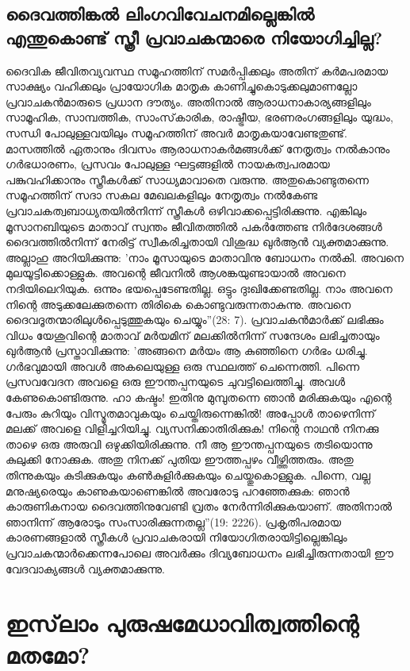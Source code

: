  \section{ ദൈവത്തിങ്കല്‍ ലിംഗവിവേചനമില്ലെങ്കില്‍ എന്തുകൊണ്ട് സ്ത്രീ പ്രവാചകന്മാരെ നിയോഗിച്ചില്ല?}

ദൈവിക ജീവിതവ്യവസ്ഥ സമൂഹത്തിന് സമര്‍പ്പിക്കലും അതിന് കര്‍മപരമായ സാക്ഷ്യം വഹിക്കലും പ്രായോഗിക മാതൃക കാണിച്ചുകൊടുക്കലുമാണല്ലോ പ്രവാചകന്‍മാരുടെ പ്രധാന ദൗത്യം. അതിനാല്‍ ആരാധനാകാര്യങ്ങളിലും സാമൂഹിക, സാമ്പത്തിക, സാംസ്‌കാരിക, രാഷ്ട്രീയ, ഭരണരംഗങ്ങളിലും യുദ്ധം, സന്ധി പോലുള്ളവയിലും സമൂഹത്തിന് അവര്‍ മാതൃകയാവേണ്ടതുണ്ട്. മാസത്തില്‍ ഏതാനും ദിവസം ആരാധനാകര്‍മങ്ങള്‍ക്ക് നേതൃത്വം നല്‍കാനും ഗര്‍ഭധാരണം, പ്രസവം പോലുള്ള ഘട്ടങ്ങളില്‍ നായകത്വപരമായ പങ്കുവഹിക്കാനും സ്ത്രീകള്‍ക്ക് സാധ്യമാവാതെ വരുന്നു. അതുകൊണ്ടുതന്നെ സമൂഹത്തിന് സദാ സകല മേഖലകളിലും നേതൃത്വം നല്‍കേണ്ട പ്രവാചകത്വബാധ്യതയില്‍നിന്ന് സ്ത്രീകള്‍ ഒഴിവാക്കപ്പെട്ടിരിക്കുന്നു. എങ്കിലും മൂസാനബിയുടെ മാതാവ് സ്വന്തം ജീവിതത്തില്‍ പകര്‍ത്തേണ്ട നിര്‍ദേശങ്ങള്‍ ദൈവത്തില്‍നിന്ന് നേരിട്ട് സ്വീകരിച്ചതായി വിശുദ്ധ ഖുര്‍ആന്‍ വ്യക്തമാക്കുന്നു. അല്ലാഹു അറിയിക്കുന്നു: 'നാം മൂസായുടെ മാതാവിനു ബോധനം നല്‍കി. അവനെ മുലയൂട്ടിക്കൊള്ളുക. അവന്റെ ജീവനില്‍ ആശങ്കയുണ്ടായാല്‍ അവനെ നദിയിലെറിയുക. ഒന്നും ഭയപ്പെടേണ്ടതില്ല. ഒട്ടും ദുഃഖിക്കേണ്ടതില്ല. നാം അവനെ നിന്റെ അടുക്കലേക്കുതന്നെ തിരികെ കൊണ്ടുവരുന്നതാകുന്നു. അവനെ ദൈവദൂതന്മാരിലുള്‍പ്പെടുത്തുകയും ചെയ്യും''(28: 7).
പ്രവാചകന്‍മാര്‍ക്ക് ലഭിക്കും വിധം യേശുവിന്റെ മാതാവ് മര്‍യമിന് മലക്കില്‍നിന്ന് സന്ദേശം ലഭിച്ചതായും ഖുര്‍ആന്‍ പ്രസ്താവിക്കുന്നു: 'അങ്ങനെ മര്‍യം ആ കുഞ്ഞിനെ ഗര്‍ഭം ധരിച്ചു. ഗര്‍ഭവുമായി അവള്‍ അകലെയുള്ള ഒരു സ്ഥലത്ത് ചെന്നെത്തി. പിന്നെ പ്രസവവേദന അവളെ ഒരു ഈന്തപ്പനയുടെ ചുവട്ടിലെത്തിച്ചു. അവള്‍ കേണുകൊണ്ടിരുന്നു. ഹാ കഷ്ടം! ഇതിനു മുമ്പുതന്നെ ഞാന്‍ മരിക്കുകയും എന്റെ പേരും കുറിയും വിസ്മൃതമാവുകയും ചെയ്തിരുന്നെങ്കില്‍! അപ്പോള്‍ താഴെനിന്ന് മലക്ക് അവളെ വിളിച്ചറിയിച്ചു. വ്യസനിക്കാതിരിക്കുക! നിന്റെ നാഥന്‍ നിനക്കു താഴെ ഒരു അരുവി ഒഴുക്കിയിരിക്കുന്നു. നീ ആ ഈന്തപ്പനയുടെ തടിയൊന്നു കുലുക്കി നോക്കുക. അതു നിനക്ക് പുതിയ ഈത്തപ്പഴം വീഴ്ത്തിത്തരും. അതു തിന്നുകയും കുടിക്കുകയും കണ്‍കുളിര്‍ക്കുകയും ചെയ്തുകൊള്ളുക. പിന്നെ, വല്ല മനുഷ്യരെയും കാണുകയാണെങ്കില്‍ അവരോടു പറഞ്ഞേക്കുക: ഞാന്‍ കാരുണികനായ ദൈവത്തിനുവേണ്ടി വ്രതം നേര്‍ന്നിരിക്കുകയാണ്. അതിനാല്‍ ഞാനിന്ന് ആരോടും സംസാരിക്കുന്നതല്ല''(19: 2226).
പ്രകൃതിപരമായ കാരണങ്ങളാല്‍ സ്ത്രീകള്‍ പ്രവാചകരായി നിയോഗിതരായിട്ടില്ലെങ്കിലും പ്രവാചകന്മാര്‍ക്കെന്നപോലെ അവര്‍ക്കും ദിവ്യബോധനം ലഭിച്ചിരുന്നതായി ഈ വേദവാക്യങ്ങള്‍ വ്യക്തമാക്കുന്നു.
\chapter{ഇസ്‌ലാം പുരുഷമേധാവിത്വത്തിന്റെ മതമോ? }
